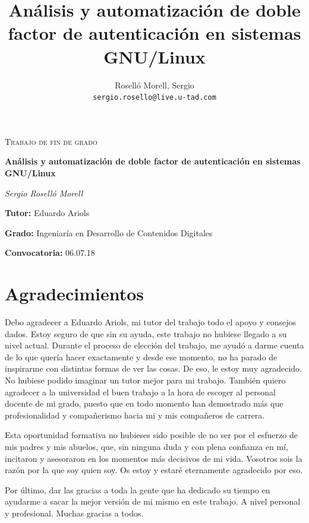\documentclass[titlepage, 12pt, a4paper]{article}
\title{Análisis y automatización de doble factor de autenticación en sistemas GNU/Linux}
\author{Roselló Morell, Sergio\\
\texttt{sergio.rosello@live.u-tad.com}}
\begin{document}
\begin{titlepage}
	\centering
	\begin{figure}
		\centering
		\qquad
	\end{figure}\par\vspace{1cm}
	{\scshape\Large Trabajo de fin de grado\par}
	\vspace{1.5cm}
	{\huge\bfseries Análisis y automatización de doble factor de autenticación en sistemas GNU/Linux\par}
	\vspace{2cm}
	{\Large\itshape Sergio Roselló Morell\par}
	\vfill
	\raggedright
	\textbf{Tutor:} Eduardo Ariols\par
	\textbf{Grado:} Ingeniaría en Desarrollo de Contenidos Digitales\par
	\textbf{Convocatoria:} 06.07.18\par

	\vfill

\end{titlepage}
\section*{Agradecimientos}
Debo agradecer a Eduardo Ariols, mi tutor del trabajo todo el apoyo y consejos dados. Estoy seguro de que sin su ayuda, este trabajo no hubiese llegado a su nivel actual. Durante el proceso de elección del trabajo, me ayudó a darme cuenta de lo que quería hacer exactamente y desde ese momento, no ha parado de inspirarme con distintas formas de ver las cosas. De eso, le estoy muy agradecido. No hubiese podido imaginar un tutor mejor para mi trabajo.
También quiero agradecer a la universidad el buen trabajo a la hora de escoger al personal docente de mi grado, puesto que en todo momento han demostrado más que profesionalidad y compañerismo hacia mi y mis compañeros de carrera.\par
Esta oportunidad formativa no hubieses sido posible de no ser por el esfuerzo de mis padres y mis abuelos, que, sin ninguna duda y con plena confianza en mí, incitaron y asesoraron en los momentos más decisivos de mi vida. Vosotros sois la razón por la que soy quien soy. Os estoy y estaré eternamente agradecido por eso.\par
Por último, dar las gracias a toda la gente que ha dedicado su tiempo en ayudarme a sacar la mejor versión de mi mismo en este trabajo. A nivel personal y profesional. Muchas gracias a todos.
\clearpage
\end{document}
